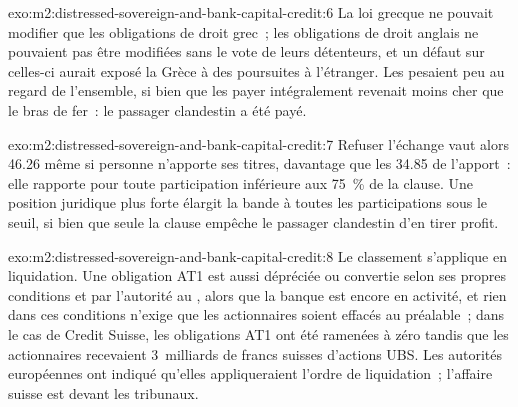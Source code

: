 \begin{solution}{exo:m2:distressed-sovereign-and-bank-capital-credit:6}
La loi grecque ne pouvait modifier que les obligations de droit grec~; les obligations de droit anglais ne pouvaient pas être
modifiées sans le vote de leurs détenteurs, et un défaut sur celles-ci aurait exposé la Grèce
à des poursuites à l'étranger. Les  pesaient peu au regard de l'ensemble, si bien que les payer
intégralement revenait moins cher que le bras de fer~: le passager clandestin a été payé.
\end{solution}

\begin{solution}{exo:m2:distressed-sovereign-and-bank-capital-credit:7}
Refuser l'échange vaut alors 46.26 même si personne n'apporte ses titres, davantage que les 34.85 de
l'apport~: elle rapporte pour toute participation inférieure aux 75~\% de la clause. Une position juridique
plus forte élargit la bande à toutes les participations sous le seuil, si bien que seule la clause
empêche le passager clandestin d'en tirer profit.
\end{solution}

\begin{solution}{exo:m2:distressed-sovereign-and-bank-capital-credit:8}
Le classement s'applique en liquidation. Une obligation AT1 est aussi dépréciée ou convertie
selon ses propres conditions et par l'autorité au , alors que la banque
est encore en activité, et rien dans ces conditions n'exige que les actionnaires soient effacés
au préalable~; dans le cas de Credit Suisse, les obligations AT1 ont été ramenées à zéro tandis que les actionnaires recevaient
3~milliards de francs suisses d'actions UBS. Les autorités européennes ont indiqué qu'elles appliqueraient
l'ordre de liquidation~; l'affaire suisse est devant les tribunaux.
\end{solution}

